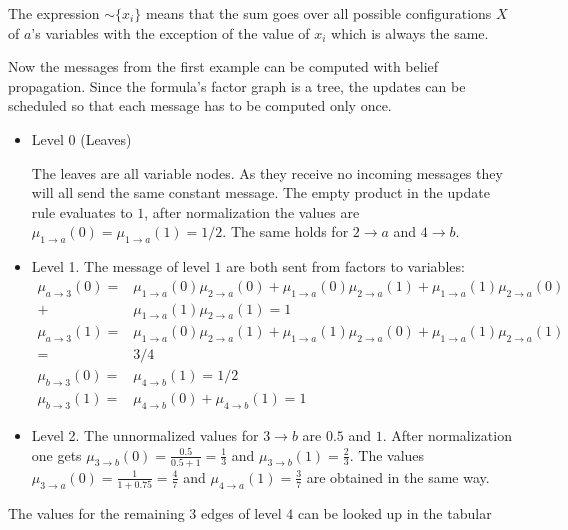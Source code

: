 The expression $\sim\{x_i\}$ means that the sum goes over all possible configurations $X$ of $a$'s variables with the exception of the value of $x_i$ which is always the same. 
\begin{example}
Now the messages from the first example can be computed with belief propagation.
Since the formula's factor graph is a tree, the updates can be scheduled so that each message has to be computed only once.

\begin{itemize}
\item Level 0 (Leaves)

The leaves are all variable nodes. As they receive no incoming messages they will all send the same constant message. The empty product in the update rule evaluates to $1$, after normalization the values are \newline $\mu_{1 \rightarrow a}(0) = \mu_{1 \rightarrow a}(1) = 1/2$. The same holds for $2 \rightarrow a$ and $4 \rightarrow b$.

\item Level 1.
The message of level $1$ are both sent from factors to variables: 
\begin{align*}
\mu_{a \rightarrow 3}(0) = &\mu_{1 \rightarrow a}(0)\mu_{2 \rightarrow a}(0) + \mu_{1 \rightarrow a}(0)\mu_{2 \rightarrow a}(1) + \mu_{1 \rightarrow a}(1) \mu_{2 \rightarrow a}(0) \\ + & \mu_{1 \rightarrow a}(1)\mu_{2 \rightarrow a}(1) = 1 \\
\mu_{a \rightarrow 3}(1) = &\mu_{1 \rightarrow a}(0)\mu_{2 \rightarrow a}(1) + \mu_{1 \rightarrow a}(1) \mu_{2 \rightarrow a}(0) + \mu_{1 \rightarrow a}(1)\mu_{2 \rightarrow a}(1) \\ = &3/4 \\
\mu_{b \rightarrow 3}(0) = &\mu_{4 \rightarrow b}(1) = 1/2 \\
\mu_{b \rightarrow 3}(1) = &\mu_{4 \rightarrow b}(0) + \mu_{4 \rightarrow b}(1) = 1
\end{align*}

\item Level 2.
The unnormalized values for $3 \rightarrow b$ are $0.5$ and $1$. After normalization one gets $\mu_{3 \rightarrow b}(0) = \frac{0.5}{0.5 + 1} = \frac{1}{3}$ and $\mu_{3 \rightarrow b}(1) = \frac{2}{3}$. \newline
The values $\mu_{3 \rightarrow a}(0) = \frac{1}{1 + 0.75} = \frac{4}{7}$ and $\mu_{4 \rightarrow a}(1) = \frac{3}{7}$ are obtained in the same way.

\end{itemize}
The values for the remaining 3 edges of level $4$ can be looked up in the tabular

\end{example}

